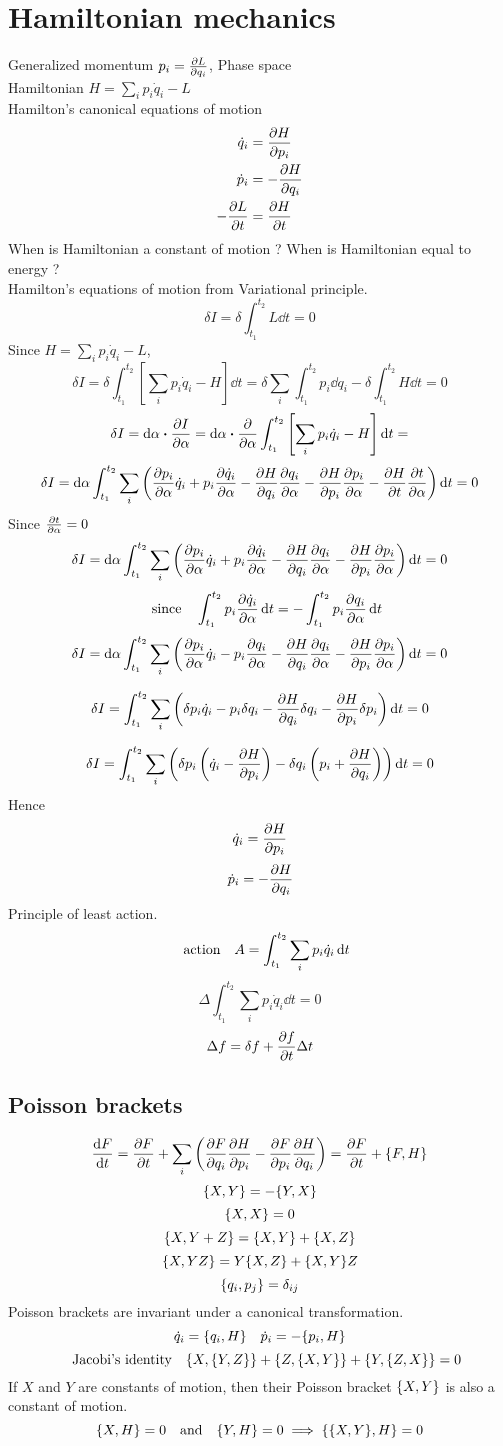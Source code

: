 \documentclass[12pt]{article}
\begin{document}
\section*{Hamiltonian mechanics}
Generalized momentum $p_i=\pdv{L}{q_i}$, Phase space\\
Hamiltonian $H=\sum_ip_i\dot{q}_i-L$\\
Hamilton's canonical equations of motion
\begin{align*}
\dot{q}_i&=\pdv{H}{p_i}\\
\dot{p}_i&=-\pdv{H}{q_i}\\
-\pdv{L}{t}&=\pdv{H}{t}
\end{align*}
When is Hamiltonian a constant of motion ? When is Hamiltonian equal to energy ?\\
Hamilton's equations of motion from Variational principle.
\[\delta{I}=\delta\int_{t_1}^{t_2}L\dd{t}=0\]
Since $H=\sum_ip_i\dot{q}_i-L$,
\[\delta{I}=\delta\int_{t_1}^{t_2}\left[\sum_ip_i\dot{q}_i-H\right]\dd{t}=\delta\sum_i\int_{t_1}^{t_2}p_i\dd{q}_i-\delta\int_{t_1}^{t_2}H\dd{t}=0\]
\[\delta{I}=\dd{\alpha}\vdot\pdv{I}{\alpha}=\dd{\alpha}\vdot\pdv{\alpha}\int_{t_1}^{t_2}\left[\sum_ip_i\dot{q}_i-H\right]\dd{t}=\]
\[\delta{I}=\dd{\alpha}\int_{t_1}^{t_2}\sum_i\left(\pdv{p_i}{\alpha}\dot{q}_i+p_i\pdv{\dot{q}_i}{\alpha}-\pdv{H}{q_i}\pdv{q_i}{\alpha}-\pdv{H}{p_i}\pdv{p_i}{\alpha}-\pdv{H}{t}\pdv{t}{\alpha}\right)\dd{t}=0\]
Since $\pdv{t}{\alpha}=0$
\[\delta{I}=\dd{\alpha}\int_{t_1}^{t_2}\sum_i\left(\pdv{p_i}{\alpha}\dot{q}_i+p_i\pdv{\dot{q}_i}{\alpha}-\pdv{H}{q_i}\pdv{q_i}{\alpha}-\pdv{H}{p_i}\pdv{p_i}{\alpha}\right)\dd{t}=0\]
\[\qq{since}\int_{t_1}^{t_2}p_i\pdv{\dot{q}_i}{\alpha}\dd{t}=-\int_{t_1}^{t_2}p_i\pdv{q_i}{\alpha}\dd{t}\]
\[\delta{I}=\dd{\alpha}\int_{t_1}^{t_2}\sum_i\left(\pdv{p_i}{\alpha}\dot{q}_i-p_i\pdv{q_i}{\alpha}-\pdv{H}{q_i}\pdv{q_i}{\alpha}-\pdv{H}{p_i}\pdv{p_i}{\alpha}\right)\dd{t}=0\]

\[\delta{I}=\int_{t_1}^{t_2}\sum_i\left(\delta{p_i}\dot{q}_i-p_i\delta{q_i}-\pdv{H}{q_i}\delta{q_i}-\pdv{H}{p_i}\delta{p_i}\right)\dd{t}=0\]

\[\delta{I}=\int_{t_1}^{t_2}\sum_i\left(\delta{p_i}\left(\dot{q}_i-\pdv{H}{p_i}\right)-\delta{q_i}\left(p_i+\pdv{H}{q_i}\right)\right)\dd{t}=0\]
Hence
\[\dot{q}_i=\pdv{H}{p_i}\]
\[\dot{p}_i=-\pdv{H}{q_i}\] 
Principle of least action.
\[\qq{action} A=\int_{t_1}^{t_2}\sum_{i}p_i\dot{q}_i\dd{t}\]
\[\Delta\int_{t_1}^{t_2}\sum_{i}p_i\dot{q}_i\dd{t}=0\]
\[\Delta{f}=\delta{f}+\pdv{f}{t}\Delta{t}\]
\subsection*{Poisson brackets}
\[\dv{F}{t}=\pdv{F}{t}+\sum_{i}\qty(\pdv{F}{q_i}\pdv{H}{p_i}-\pdv{F}{p_i}\pdv{H}{q_i})=\pdv{F}{t}+\pb{F}{H}\]
\[\pb{X}{Y}=-\pb{Y}{X}\]
\[\pb{X}{X}=0\]
\[\pb{X}{Y+Z}=\pb{X}{Y}+\pb{X}{Z}\]
\[\pb{X}{YZ}=Y\pb{X}{Z}+\pb{X}{Y}Z\]
\[\pb{q_i}{p_j}=\delta_{ij}\]
Poisson brackets are invariant under a canonical transformation.\\
\[\dot{q}_i=\pb{q_i}{H}\quad\dot{p}_i=-\pb{p_i}{H}\]
\[\qq{Jacobi's identity}\pb{X}{\pb{Y}{Z}}+\pb{Z}{\pb{X}{Y}}+\pb{Y}{\pb{Z}{X}}=0\]
If $X$ and $Y$ are constants of motion, then their Poisson bracket $\pb{X}{Y}$ is also a constant of motion.
\[\pb{X}{H}=0\qq{and}\pb{Y}{H}=0\implies\pb{\pb{X}{Y}}{H}=0\]
\end{document}
